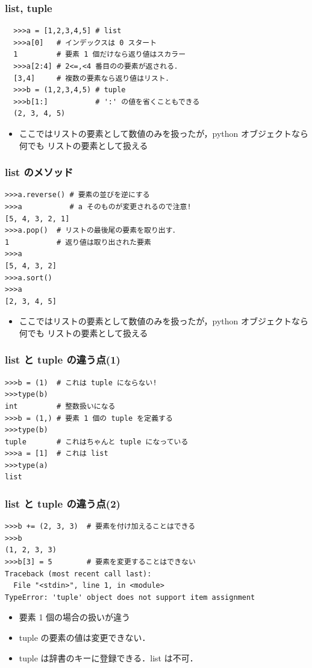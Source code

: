 \begin{frame}[t,fragile]
 \frametitle{list, tuple}
 \begin{lstlisting}
  >>>a = [1,2,3,4,5] # list
  >>>a[0]   # インデックスは 0 スタート
  1         # 要素 1 個だけなら返り値はスカラー
  >>>a[2:4] # 2<=,<4 番目のの要素が返される．
  [3,4]     # 複数の要素なら返り値はリスト．
  >>>b = (1,2,3,4,5) # tuple
  >>>b[1:]           # ':' の値を省くこともできる
  (2, 3, 4, 5)
 \end{lstlisting}
 \begin{itemize}
  \item ここではリストの要素として数値のみを扱ったが，python オブジェクトなら何でも リストの要素として扱える
 \end{itemize}
\end{frame}

\begin{frame}[t,fragile]
\frametitle{list のメソッド}
\begin{lstlisting}
>>>a.reverse() # 要素の並びを逆にする
>>>a           # a そのものが変更されるので注意!
[5, 4, 3, 2, 1]
>>>a.pop()  # リストの最後尾の要素を取り出す．
1           # 返り値は取り出された要素
>>>a
[5, 4, 3, 2]
>>>a.sort()
>>>a
[2, 3, 4, 5]
\end{lstlisting}
\begin{itemize}
\item ここではリストの要素として数値のみを扱ったが，python オブジェクトなら何でも リストの要素として扱える
\end{itemize}
\end{frame}




\begin{frame}[t,fragile]
\frametitle{list と tuple の違う点(1)}
\begin{lstlisting}
>>>b = (1)  # これは tuple にならない!
>>>type(b)
int         # 整数扱いになる
>>>b = (1,) # 要素 1 個の tuple を定義する
>>>type(b)
tuple       # これはちゃんと tuple になっている
>>>a = [1]  # これは list
>>>type(a)
list
\end{lstlisting}
\end{frame}

\begin{frame}[t,fragile]
\frametitle{list と tuple の違う点(2)}
\begin{lstlisting}
>>>b += (2, 3, 3)  # 要素を付け加えることはできる
>>>b
(1, 2, 3, 3)
>>>b[3] = 5        # 要素を変更することはできない
Traceback (most recent call last):
  File "<stdin>", line 1, in <module>
TypeError: 'tuple' object does not support item assignment
\end{lstlisting}
\begin{itemize}
\item 要素 1 個の場合の扱いが違う
\item tuple の要素の値は変更できない．
\item tuple は辞書のキーに登録できる．list は不可．
\end{itemize}

\end{frame}

